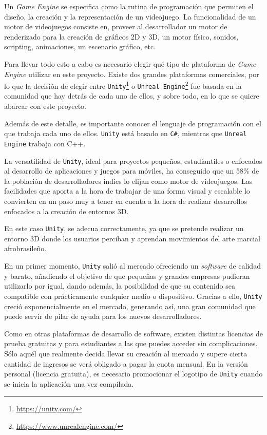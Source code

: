 Un \textit{Game Engine} se especifica como la rutina de programación que permiten el diseño, la creación y la representación de un videojuego. La funcionalidad de un motor de videojuegos consiste en, proveer al desarrollador un motor de renderizado para la creación de gráficos 2D y 3D, un motor físico, sonidos, scripting, animaciones, un escenario gráfico, etc.

Para llevar todo esto a cabo es necesario elegir qué tipo de plataforma de \textit{Game Engine} utilizar en este proyecto. Existe dos grandes plataformas comerciales, por lo que la decisión de elegir entre \texttt{Unity}\footnote{\url{https://unity.com/}} o \texttt{Unreal Engine}\footnote{\url{https://www.unrealengine.com/}} fue basada en la comunidad que hay detrás de cada uno de ellos, y sobre todo, en lo que se quiere abarcar con este proyecto.

Además de este detalle, es importante conocer el lenguaje de programación con el que trabaja cada uno de ellos. \texttt{Unity} está basado en \texttt{C\#}, mientras que \texttt{Unreal Engine} trabaja con C++.

La versatilidad de \texttt{Unity}, ideal para proyectos pequeños, estudiantiles o enfocados al desarrollo de aplicaciones y juegos para móviles, ha conseguido que un 58\% de la población de desarrolladores indies lo elijan como motor de videojuegos. Las facilidades que aporta a la hora de trabajar de una forma visual y escalable lo convierten en un paso muy a tener en cuenta a la hora de realizar desarrollos enfocados a la creación de entornos 3D.

En este caso \texttt{Unity}, se adecua correctamente, ya que se pretende realizar un entorno 3D donde los usuarios perciban y aprendan movimientos del arte marcial afrobrasileño.

En un primer momento, \texttt{Unity} salió al mercado ofreciendo un \textit{software} de calidad y barato, añadiendo el objetivo de que pequeñas y grandes empresas pudieran utilizarlo por igual, dando además, la posibilidad de que su contenido sea compatible con prácticamente cualquier medio o dispositivo\cite{Unity-relations}. Gracias a ello, \texttt{Unity} creció exponencialmente en el mercado, generando así, una gran comunidad que puede servir de pilar de ayuda para los nuevos desarrolladores.

Como en otras plataformas de desarrollo de software, existen distintas licencias de prueba gratuitas y para estudiantes a las que puedes acceder sin complicaciones. Sólo aquél que realmente decida llevar su creación al mercado y supere cierta cantidad de ingresos se verá obligado a pagar la cuota mensual. En la versión personal (licencia gratuita), es necesario promocionar el logotipo de \texttt{Unity} cuando se inicia la aplicación una vez compilada.

